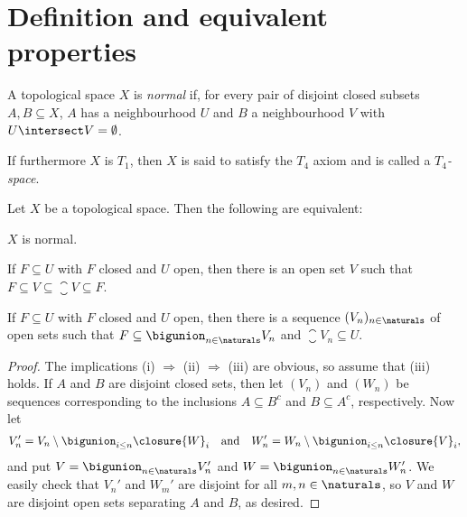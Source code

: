 \documentclass[article, a4paper, 11pt, oneside]{memoir}
\numberwithin{equation}{chapter}
\renewcommand{\implies}{\Rightarrow}
\begin{document}
\section{Definition and equivalent properties}

\begin{definition}
    A topological space $X$ is \emph{normal} if, for every pair of disjoint closed subsets $A,B \subseteq X$, $A$ has a neighbourhood $U$ and $B$ a neighbourhood $V$ with $U \intersect V = \emptyset$.

    If furthermore $X$ is $T_1$, then $X$ is said to satisfy the $T_4$ axiom and is called a \emph{$T_4$-space}.
\end{definition}

\begin{proposition}
    Let $X$ be a topological space. Then the following are equivalent:
    \begin{enumprop}
        \item $X$ is normal.
        \item If $F \subseteq U$ with $F$ closed and $U$ open, then there is an open set $V$ such that $F \subseteq V \subseteq \closure{V} \subseteq F$.
        \item If $F \subseteq U$ with $F$ closed and $U$ open, then there is a sequence $(V_n)_{n \in \naturals}$ of open sets such that $F \subseteq \bigunion_{n \in \naturals} V_n$ and $\closure{V}_n \subseteq U$.
    \end{enumprop}
\end{proposition}

\begin{proof}
    The implications (i) $\implies$ (ii) $\implies$ (iii) are obvious, so assume that (iii) holds. If $A$ and $B$ are disjoint closed sets, then let $(V_n)$ and $(W_n)$ be sequences corresponding to the inclusions $A \subseteq B^c$ and $B \subseteq A^c$, respectively. Now let
    \begin{equation*}
        V_n'
            = V_n \setminus \bigunion_{i \leq n} \closure{W}_i
        \quad \text{and} \quad
        W_n'
            = W_n \setminus \bigunion_{i \leq n} \closure{V}_i,
    \end{equation*}
    and put $V = \bigunion_{n \in \naturals} V_n'$ and $W = \bigunion_{n \in \naturals} W_n'$. We easily check that $V_n'$ and $W_m'$ are disjoint for all $m,n \in \naturals$, so $V$ and $W$ are disjoint open sets separating $A$ and $B$, as desired.
\end{proof}
\end{document}
